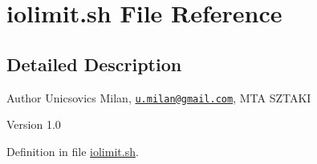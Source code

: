 \hypertarget{iolimit_8sh}{
\section{iolimit.sh File Reference}
\label{iolimit_8sh}
}


\subsection{Detailed Description}
\begin{DoxyAuthor}{Author}
Unicsovics Milan, \href{mailto:u.milan@gmail.com}{\tt u.milan@gmail.com}, MTA SZTAKI
\end{DoxyAuthor}
\begin{DoxyVersion}{Version}
1.0 
\end{DoxyVersion}


Definition in file \hyperlink{iolimit_8sh_source}{iolimit.sh}.

